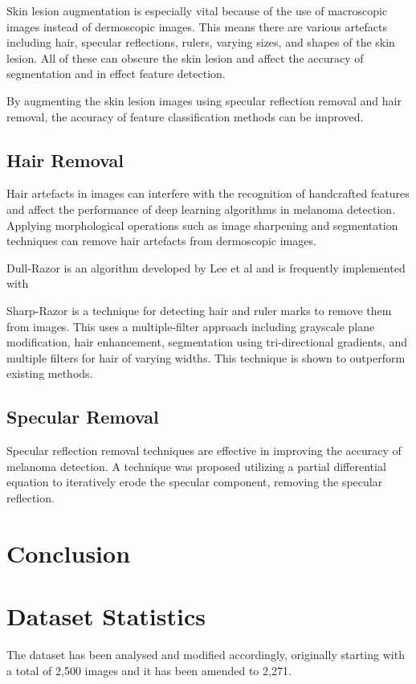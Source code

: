 Skin lesion augmentation is especially vital because of the use of macroscopic images instead of dermoscopic images. This means there are various artefacts including hair, specular reflections, rulers, varying sizes, and shapes of the skin lesion. All of these can obscure the skin lesion and affect the accuracy of segmentation\cite{Unver2019} and in effect feature detection.

By augmenting the skin lesion images using specular reflection removal and hair removal, the accuracy of feature classification methods can be improved\cite{kasmi2023}. 

\subsection{Hair Removal}
Hair artefacts in images can interfere with the recognition of handcrafted features and affect the performance of deep learning algorithms in melanoma detection\cite{kasmi2023}. Applying morphological operations such as image sharpening and segmentation techniques can remove hair artefacts from dermoscopic images\cite{kasmi2023}.

Dull-Razor is an algorithm developed by Lee et al\cite{Lee1997} and is frequently implemented with 

Sharp-Razor\cite{kasmi2023} is a technique for detecting hair and ruler marks to remove them from images. This uses a multiple-filter approach including grayscale plane modification, hair enhancement, segmentation using tri-directional gradients, and multiple filters for hair of varying widths. This technique is shown to outperform existing methods.

\subsection{Specular Removal}
Specular reflection removal techniques are effective in improving the accuracy of melanoma detection\cite{Shen2009}. A technique was proposed utilizing a partial differential equation to iteratively erode the specular component, removing the specular reflection\cite{Shen2009}.


\section{Conclusion}



\section{Dataset Statistics}
The dataset has been analysed and modified accordingly, originally starting with a total of 2,500 images and it has been amended to 2,271.

